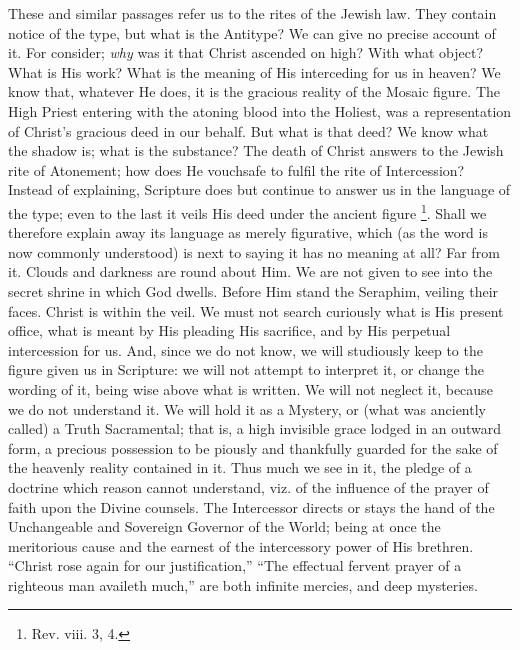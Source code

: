 These and similar passages refer us to the rites of the Jewish law.
They contain notice of the type, but what is the Antitype? We can give
no precise account of it. For consider; \emph{why} was it that Christ
ascended on high? With what object? What is His work? What is the
meaning of His interceding for us in heaven? We know that, whatever He
does, it is the gracious reality of the Mosaic figure. The High Priest
entering with the atoning blood into the Holiest, was a representation
of Christ's gracious deed in our behalf. But what is that deed? We know
what the shadow is; what is the substance? The death of Christ answers
to the Jewish rite of Atonement; how does He vouchsafe to fulfil the
rite of Intercession? Instead of explaining, Scripture does but continue
to answer us in the language of the type; even to the last it veils His
deed under the ancient figure \footnote{Rev. viii. 3, 4.}.
Shall we therefore explain away its language as merely figurative, which
(as the word is now commonly understood) is next to saying it has no
meaning at all? Far from it. Clouds and darkness are round about Him. We
are not given to see into the secret shrine in which God dwells. Before
Him stand the Seraphim, veiling their faces. Christ is within the veil.
We must not search curiously what is His present office, what is meant
by His pleading His sacrifice, and by His perpetual intercession for us.
And, since we do not know, we will studiously keep to the figure given
us in Scripture: we will not attempt to interpret it, or change the
wording of it, being wise above what is written. We will not neglect it,
because we do not understand it. We will hold it as a Mystery, or (what
was anciently called) a Truth Sacramental; that is, a high invisible
grace lodged in an outward form, a precious possession to be piously and
thankfully guarded for the sake of the heavenly reality contained in it.
Thus much we see in it, the pledge of a doctrine which reason cannot
understand, viz. of the influence of the prayer of faith upon the Divine
counsels. The Intercessor directs or stays the hand of the Unchangeable
and Sovereign Governor of the World; being at once the meritorious cause
and the earnest of the intercessory power of His brethren. ``Christ
rose again for our justification,'' ``The effectual fervent
prayer of a righteous man availeth much,'' are both infinite
mercies, and deep mysteries.

